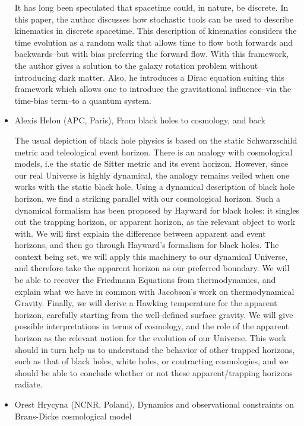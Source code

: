 \documentclass[letterpaper,12pt]{article}
\newcommand{\talk}[2]{{\fontspec{Lato Bold} #1,} {\fontspec{Lato Italic} #2}}
\begin{document}
\begin{itemize}
It has long been speculated that spacetime could, in nature, be discrete. In this paper, the author discusses how stochastic tools can be used to describe kinematics in discrete spacetime. This description of kinematics considers the time evolution as a random walk that allows time to flow both forwards and backwards--but with bias preferring the forward flow. With this framework, the author gives a solution to the galaxy rotation problem without introducing dark matter. Also, he introduces a Dirac equation suiting this framework which allows one to introduce the gravitational influence--via the time-bias term--to a quantum system.

\item \talk{Alexis Helou (APC, Paris)}{From black holes to cosmology, and back}

The usual depiction of black hole physics is based on the static Schwarzschild metric and teleological event horizon. There is an analogy with cosmological models, i.e the static de Sitter metric and its event horizon. However, since our real Universe is highly dynamical, the analogy remains veiled when one works with the static black hole. Using a dynamical description of black hole horizon, we find a striking parallel with our cosmological horizon. Such a dynamical formalism has been proposed by Hayward for black holes: it singles out the trapping horizon, or apparent horizon, as the relevant object to work with. We will first explain the difference between apparent and event horizons, and then go through Hayward’s formalism for black holes. The context being set, we will apply this machinery to our dynamical Universe, and therefore take the apparent horizon as our preferred boundary. We will be able to recover the Friedmann Equations from thermodynamics, and explain what we have in common with Jacobson’s work on thermodynamical Gravity. Finally, we will derive a Hawking temperature for the apparent horizon, carefully starting from the well-defined surface gravity. We will give possible interpretations in terms of cosmology, and the role of the apparent horizon as the relevant notion for the evolution of our Universe. This work should in turn help us to understand the behavior of other trapped horizons, such as that of black holes, white holes, or contracting cosmologies, and we should be able to conclude whether or not these apparent/trapping horizons radiate.

\item \talk{Orest Hrycyna (NCNR, Poland)}{Dynamics and observational constraints on Brans-Dicke cosmological model}


\end{itemize}
\end{document}
